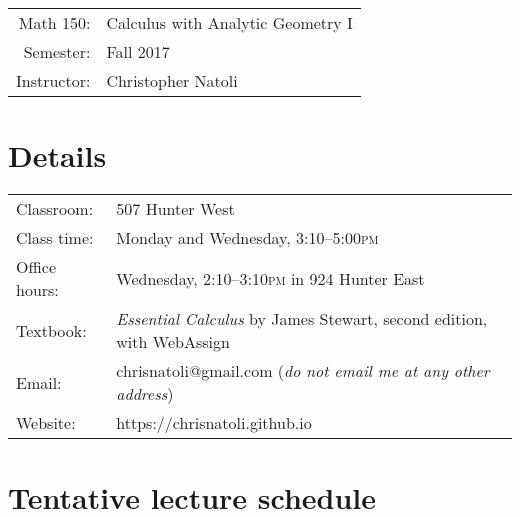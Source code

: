 \documentclass[11pt]{article}
\begin{document}
\begin{table}[h]
    \sc
    \large
    \centering 
    \begin{tabular}{rl}
        Math 150:&Calculus with Analytic Geometry I\\
        Semester:&Fall 2017\\
        Instructor:&Christopher Natoli
    \end{tabular}
\end{table}

\section{Details}

\begin{table}[h]
    \begin{tabular}{@{}ll}
        Classroom:&507 Hunter West\\
        Class time:&Monday and Wednesday, 3:10--5:00\textsc{pm}\\
        Office hours:&Wednesday, 2:10--3:10\textsc{pm} in 924 Hunter East\\
        Textbook:&\textit{Essential Calculus} by James Stewart, second edition, with WebAssign\\
        Email:&chrisnatoli@gmail.com (\textit{do not email me at any other address})\\
        Website:&https://chrisnatoli.github.io
    \end{tabular}
\end{table}

\vspace{-0.5cm}

\section{Tentative lecture schedule}
\end{document}
